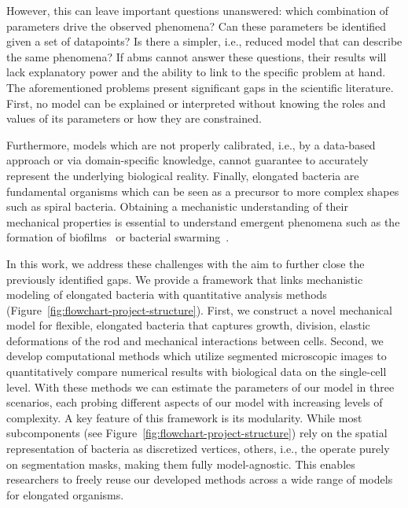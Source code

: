 \documentclass[10pt,letterpaper]{article}
\begin{document}
However, this can leave important questions unanswered:
which combination of parameters drive the observed phenomena?
Can these parameters be identified given a set of datapoints?
Is there a simpler, i.e., reduced model that can describe the same phenomena?
If \acp{abm} cannot answer these questions, their results will lack explanatory power and the
ability to link to the specific problem at hand.
The aforementioned problems present significant gaps in the scientific literature.
First, no model can be explained or interpreted without knowing the roles and values of its
parameters or how they are constrained.

Furthermore, models which are not properly calibrated, i.e., by a data-based approach or via
domain-specific knowledge, cannot guarantee to accurately represent the underlying biological reality.
Finally, elongated bacteria are fundamental organisms which can be seen as a precursor to
more complex shapes such as spiral bacteria.
Obtaining a mechanistic understanding of their mechanical properties is essential to understand
emergent phenomena such as the formation of biofilms~\cite{Li2025} or bacterial
swarming~\cite{Starru2007}.

In this work, we address these challenges with the aim to further close the previously identified
gaps. We provide a framework that links mechanistic modeling of elongated bacteria with quantitative
analysis methods (Figure~\ref{fig:flowchart-project-structure}).
First, we construct a novel mechanical model for flexible, elongated bacteria that captures growth,
division, elastic deformations of the rod and mechanical interactions between cells.
Second, we develop computational methods which utilize segmented microscopic images to
quantitatively compare numerical results with biological data on the single-cell level.
With these methods we can estimate the parameters of our model in three scenarios, each probing
different aspects of our model with increasing levels of complexity.
A key feature of this framework is its modularity.
While most subcomponents (see Figure~\ref{fig:flowchart-project-structure}) rely on the spatial
representation of bacteria as discretized vertices, others, i.e., the
 operate purely on segmentation masks, making them fully
model-agnostic.
This enables researchers to freely reuse our developed methods across a wide range of models for
elongated organisms.
\end{document}

